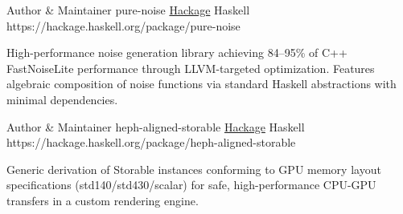 
\begin{cventries}

\projentry
  {Author \& Maintainer} %
  {pure-noise} %
  {\href{https://hackage.haskell.org/package/pure-noise}{Hackage}} %
  {Haskell} %
  {https://hackage.haskell.org/package/pure-noise} %
  {
    \begin{cvitems}
      \item{High-performance noise generation library achieving 84--95\% of C++ FastNoiseLite performance through LLVM-targeted optimization. Features algebraic composition of noise functions via standard Haskell abstractions with minimal dependencies.}
    \end{cvitems}
  }

\projentry
  {Author \& Maintainer} %
  {heph-aligned-storable} %
  {\href{https://hackage.haskell.org/package/heph-aligned-storable}{Hackage}} %
  {Haskell} %
  {https://hackage.haskell.org/package/heph-aligned-storable} %
  {
    \begin{cvitems}
      \item{Generic derivation of Storable instances conforming to GPU memory layout specifications (std140/std430/scalar) for safe, high-performance CPU-GPU transfers in a custom rendering engine.}
    \end{cvitems}
  }

\end{cventries}
